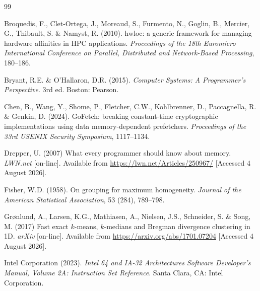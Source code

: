 \documentclass[conference]{IEEEtran}
\begin{document}
\begin{thebibliography}{99}

Broquedis, F., Clet-Ortega, J., Moreaud, S., Furmento, N., Goglin, B.,
Mercier, G., Thibault, S. \& Namyst, R. (2010). hwloc: a generic framework for
managing hardware affinities in HPC applications. \textit{Proceedings of the 18th
Euromicro International Conference on Parallel, Distributed and Network-Based
Processing}, 180--186.

Bryant, R.E. \& O'Hallaron, D.R. (2015). \textit{Computer Systems: A
Programmer's Perspective}. 3rd ed. Boston: Pearson.

Chen, B., Wang, Y., Shome, P., Fletcher, C.W., Kohlbrenner, D., Paccagnella, R.
\& Genkin, D. (2024). GoFetch: breaking constant-time cryptographic
implementations using data memory-dependent prefetchers. \textit{Proceedings of
the 33rd USENIX Security Symposium}, 1117--1134.

Drepper, U. (2007) What every programmer should know about memory. \textit{LWN.net}
[on-line]. Available from \url{https://lwn.net/Articles/250967/} [Accessed 4 August 2026].

Fisher, W.D. (1958). On grouping for maximum homogeneity. \textit{Journal of the
American Statistical Association}, 53 (284), 789--798.

Gr\o{}nlund, A., Larsen, K.G., Mathiasen, A., Nielsen, J.S., Schneider, S. \&
Song, M. (2017) Fast exact $k$-means, $k$-medians and Bregman divergence
clustering in 1D. \textit{arXiv} [on-line]. Available from
\url{https://arxiv.org/abs/1701.07204} [Accessed 4 August 2026].

Intel Corporation (2023). \textit{Intel 64 and IA-32 Architectures Software
Developer's Manual, Volume 2A: Instruction Set Reference}. Santa Clara, CA: Intel
Corporation.


\end{thebibliography}
\end{document}
